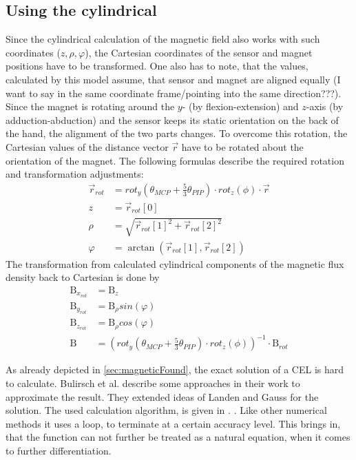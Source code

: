 \subsection{Using the cylindrical} \label{subsec:implCyl}

Since the cylindrical calculation of the magnetic field also works with such coordinates ($ z, \rho, \varphi $), the Cartesian coordinates of the sensor and magnet positions have to be transformed. One also has to note, that the values, calculated by this model assume, that sensor and magnet are aligned equally (I want to say in the same coordinate frame/pointing into the same direction???). Since the magnet is rotating around the $ y $- (by flexion-extension) and $ z $-axis (by adduction-abduction) and the sensor keeps its static orientation on the back of the hand, the alignment of the two parts changes. To overcome this rotation, the Cartesian values of the distance vector $ \vec{r} $ have to be rotated about the orientation of the magnet. The following formulas describe the required rotation and transformation adjustments:
\begin{equation}
\begin{aligned}
\vec{r}_{rot} &= rot_{y}(\theta_{MCP} + \frac{5}{3} \theta_{PIP}) \cdot rot_{z}(\phi) \cdot \vec{r}\\[3pt]
z &= \vec{r}_{rot}[0]\\
\rho &= \sqrt{\vec{r}_{rot}[1]^{2} + \vec{r}_{rot}[2]^2}\\
\varphi &= \arctan(\vec{r}_{rot}[1], \vec{r}_{rot}[2])
\end{aligned}
\end{equation}
The transformation from calculated cylindrical components of the magnetic flux density back to Cartesian is done by
\begin{equation}
\begin{aligned}
\mathrm{B}_{x_{rot}} &= \mathrm{B}_{z}\\
\mathrm{B}_{y_{rot}} &= \mathrm{B}_{\rho}sin(\varphi)\\
\mathrm{B}_{z_{rot}} &= \mathrm{B}_{\rho}cos(\varphi)\\[3pt]
\mathrm{B} &= (rot_{y}(\theta_{MCP} + \frac{5}{3} \theta_{PIP}) \cdot rot_{z}(\phi))^{-1} \cdot \mathrm{B}_{rot}
\end{aligned}
\end{equation}

As already depicted in \ref{sec:magneticFound}, the exact solution of a \ac{CEL} is hard to calculate. Bulirsch et al. \cite{bulirsch1965numerical} describe some approaches in their work to approximate the result. They extended ideas of Landen and Gauss for the solution. The used calculation algorithm, is given in \cite{derby2010cylindrical}. . Like other numerical methods it uses a loop, to terminate at a certain accuracy level. This brings in, that the function can not further be treated as a natural equation, when it comes to further differentiation.



